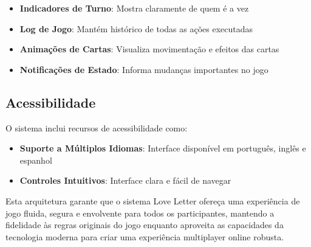 \begin{itemize}
    \item \textbf{Indicadores de Turno}: Mostra claramente de quem é a vez
    \item \textbf{Log de Jogo}: Mantém histórico de todas as ações executadas
    \item \textbf{Animações de Cartas}: Visualiza movimentação e efeitos das cartas
    \item \textbf{Notificações de Estado}: Informa mudanças importantes no jogo
\end{itemize}

\subsection{Acessibilidade}
O sistema inclui recursos de acessibilidade como:

\begin{itemize}
    \item \textbf{Suporte a Múltiplos Idiomas}: Interface disponível em português, inglês e espanhol
    \item \textbf{Controles Intuitivos}: Interface clara e fácil de navegar
\end{itemize}

Esta arquitetura garante que o sistema Love Letter ofereça uma experiência de jogo fluida, segura e envolvente para todos os participantes, mantendo a fidelidade às regras originais do jogo enquanto aproveita as capacidades da tecnologia moderna para criar uma experiência multiplayer online robusta.
